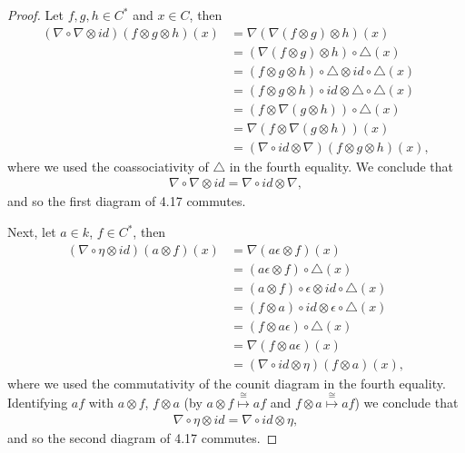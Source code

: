 \documentclass[8pt]{extarticle}
\newcommand{\<}{\langle}
\renewcommand{\>}{\rangle}
\theoremstyle{definition}
\begin{document}
\begin{proof}
  Let $f,g,h \in C^*$ and $x \in C$, then 
  \begin{align*}
    (\nabla \circ \nabla \otimes id)(f \otimes g \otimes h)(x)
    &= \nabla(\nabla(f \otimes g) \otimes h)(x)\\
    &= (\nabla(f \otimes g) \otimes h) \circ \triangle(x)\\
    &= (f \otimes g \otimes h) \circ \triangle \otimes id \circ \triangle(x)\\
    &= (f \otimes g \otimes h) \circ id \otimes \triangle \circ \triangle(x)\\
    &= (f \otimes \nabla(g \otimes h))\circ \triangle(x)\\
    &= \nabla(f \otimes \nabla(g \otimes h))(x) \\
    &= (\nabla\circ id \otimes \nabla)(f \otimes g \otimes h)(x),    
  \end{align*}
  where we used the coassociativity of $\triangle$ in the fourth equality. We conclude that
  \begin{align*}
    \nabla \circ \nabla \otimes id = \nabla\circ id \otimes \nabla,
  \end{align*}
  and so the first diagram of 4.17 commutes.

  Next, let $a \in k$, $f \in C^*$, then
  \begin{align*}
    (\nabla \circ \eta \otimes id)(a \otimes f)(x)
    &=
    \nabla(a \epsilon \otimes f)(x) \\
    &=
    (a \epsilon \otimes f) \circ \triangle (x) \\
    &=
    (a \otimes f)\circ \epsilon \otimes id \circ \triangle (x) \\
    &=
    (f \otimes a) \circ id \otimes \epsilon \circ \triangle (x) \\
    &=
    (f \otimes a \epsilon)  \circ \triangle (x) \\
    &=
    \nabla(f \otimes a \epsilon) (x) \\
    &= (\nabla \circ id \otimes \eta)(f \otimes a) (x),
  \end{align*}
  where we used the commutativity of the counit diagram in the fourth equality. Identifying $af$ with $a \otimes f$, $f \otimes a$ (by $a \otimes f \overset{\cong}{\mapsto} af$ and $f \otimes a \overset{\cong}{\mapsto} af$) we conclude that
  \begin{align*}
    \nabla \circ \eta \otimes id = \nabla \circ id \otimes \eta,
  \end{align*}
  and so the second diagram of 4.17 commutes.
\end{proof}
\end{document}
